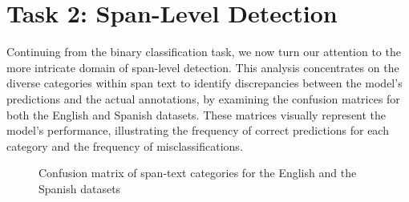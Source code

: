 \documentclass{Configuration_Files/PoliMi3i_thesis}
\begin{document}
\section{Task 2: Span-Level Detection}
Continuing from the binary classification task, we now turn our attention to the more intricate domain of span-level detection. This analysis concentrates on the diverse categories within span text to identify discrepancies between the model's predictions and the actual annotations, by examining the confusion matrices for both the English and Spanish datasets. These matrices visually represent the model's performance, illustrating the frequency of correct predictions for each category and the frequency of misclassifications.

\begin{figure}[H]
    \centering
    \caption{Confusion matrix of span-text categories for the English and the Spanish datasets}
    \label{fig:confusion_matrix_en_es}
\end{figure}
\FloatBarrier
\end{document}

